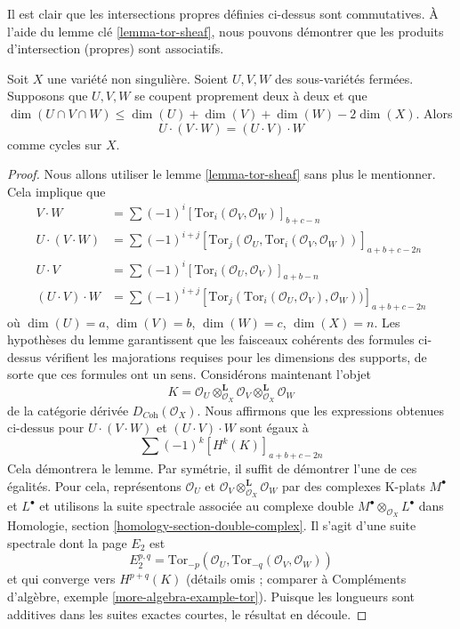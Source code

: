 \noindent
Il est clair que les intersections propres définies ci-dessus sont commutatives.
À l'aide du lemme clé \ref{lemma-tor-sheaf}, nous pouvons démontrer que les produits
d'intersection (propres) sont associatifs.

\begin{lemma}
\label{lemma-associative}
Soit $X$ une variété non singulière. Soient $U, V, W$ des sous-variétés
fermées. Supposons que $U, V, W$ se coupent proprement deux à deux
et que $\dim(U \cap V \cap W) \leq \dim(U) + \dim(V) + \dim(W) - 2\dim(X)$.
Alors
$$
U \cdot (V \cdot W) = (U \cdot V) \cdot W
$$
comme cycles sur $X$.
\end{lemma}

\begin{proof}
Nous allons utiliser le lemme \ref{lemma-tor-sheaf} sans plus le mentionner.
Cela implique que
\begin{align*}
V \cdot W
& =
\sum (-1)^i [\text{Tor}_i(\mathcal{O}_V, \mathcal{O}_W)]_{b + c - n} \\
U \cdot (V \cdot W)
& =
\sum (-1)^{i + j}
[
\text{Tor}_j(\mathcal{O}_U, \text{Tor}_i(\mathcal{O}_V, \mathcal{O}_W))
]_{a + b + c - 2n} \\
U \cdot V
& =
\sum (-1)^i [\text{Tor}_i(\mathcal{O}_U, \mathcal{O}_V)]_{a + b - n} \\
(U \cdot V) \cdot W
& =
\sum (-1)^{i + j}
[
\text{Tor}_j(\text{Tor}_i(\mathcal{O}_U, \mathcal{O}_V), \mathcal{O}_W))
]_{a + b + c - 2n}
\end{align*}
où $\dim(U) = a$, $\dim(V) = b$, $\dim(W) = c$, $\dim(X) = n$.
Les hypothèses du lemme garantissent que les faisceaux cohérents
des formules ci-dessus vérifient les majorations requises pour les dimensions
des supports, de sorte que ces formules ont un sens. Considérons maintenant l'objet
$$
K =
\mathcal{O}_U \otimes^\mathbf{L}_{\mathcal{O}_X} \mathcal{O}_V
\otimes^\mathbf{L}_{\mathcal{O}_X} \mathcal{O}_W
$$
de la catégorie dérivée $D_{\textit{Coh}}(\mathcal{O}_X)$.
Nous affirmons que les expressions obtenues ci-dessus pour
$U \cdot (V \cdot W)$ et $(U \cdot V) \cdot W$
sont égaux à
$$
\sum (-1)^k [H^k(K)]_{a + b + c - 2n}
$$
Cela démontrera le lemme. Par symétrie, il suffit de démontrer l'une
de ces égalités. Pour cela, représentons $\mathcal{O}_U$
et $\mathcal{O}_V \otimes_{\mathcal{O}_X}^\mathbf{L} \mathcal{O}_W$
par des complexes K-plats $M^\bullet$ et $L^\bullet$ et utilisons la
suite spectrale associée au complexe double
$M^\bullet \otimes_{\mathcal{O}_X} L^\bullet$ dans
Homologie, section \ref{homology-section-double-complex}.
Il s'agit d'une suite spectrale dont la page $E_2$ est
$$
E_2^{p, q} =
\text{Tor}_{-p}(\mathcal{O}_U, \text{Tor}_{-q}(\mathcal{O}_V, \mathcal{O}_W))
$$
et qui converge vers $H^{p + q}(K)$ (détails omis ; comparer à
Compléments d'algèbre, exemple \ref{more-algebra-example-tor}).
Puisque les longueurs sont additives dans les suites
exactes courtes, le résultat en découle.
\end{proof}




